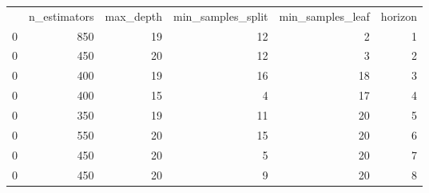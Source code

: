 \begin{tabular}{lrrrrr}
 & n_estimators & max_depth & min_samples_split & min_samples_leaf & horizon \\
0 & 850 & 19 & 12 & 2 & 1 \\
0 & 450 & 20 & 12 & 3 & 2 \\
0 & 400 & 19 & 16 & 18 & 3 \\
0 & 400 & 15 & 4 & 17 & 4 \\
0 & 350 & 19 & 11 & 20 & 5 \\
0 & 550 & 20 & 15 & 20 & 6 \\
0 & 450 & 20 & 5 & 20 & 7 \\
0 & 450 & 20 & 9 & 20 & 8 \\
\end{tabular}
